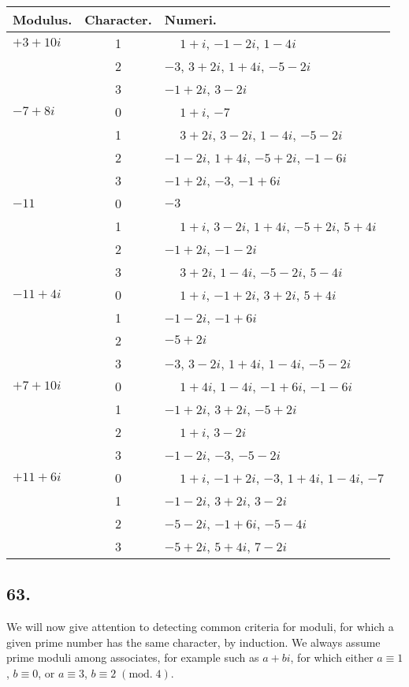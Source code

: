 \documentclass[twoside,12pt, showframe]{memoir}
\renewcommand{\pmod}[1]{\;(\textrm{mod.}\;#1)}
\begin{document}
\begin{center}
\begin{tabular}{l|c|l}
Modulus. & Character. & Numeri. \\
\hline
\(+3+10 i\) & 1 & \(\phantom{+}1+i\), \(-1-2 i\), \(1-4 i\) \\
 & 2 & \(-3\), \(3+2 i\), \(1+4 i\), \(-5-2 i\) \\
 & 3 & \(-1+2 i\), \(3-2 i\) \\
\(-7+8 i\) & 0 & \(\phantom{+}1+i\), \(-7\) \\
 & 1 & \(\phantom{+}3+2 i\), \(3-2 i\), \(1-4 i\), \(-5-2 i\) \\
 & 2 & \(-1-2 i\), \(1+4 i\), \(-5+2 i\), \(-1-6 i\) \\
 & 3 & \(-1+2 i\), \(-3\), \(-1+6 i\) \\
\(-11\) & 0 & \(-3\) \\
 & 1 & \(\phantom{+}1+i\), \(3-2 i\), \(1+4 i\), \(-5+2 i\), \(5+4 i\) \\
 & 2 & \(-1+2 i\), \(-1-2 i\) \\
 & 3 & \(\phantom{+}3+2 i\), \(1-4 i\), \(-5-2 i\), \(5-4 i\) \\
\(-11+4 i\) & 0 & \(\phantom{+}1+i\), \(-1+2 i\), \(3+2 i\), \(5+4 i\) \\
 & 1 & \(-1-2 i\), \(-1+6 i\) \\
 & 2 & \(-5+2 i\) \\
 & 3 & \(-3\), \(3-2 i\), \(1+4 i\), \(1-4 i\), \(-5-2 i\) \\
\(+7+10 i\) & 0 & \(\phantom{+}1+4 i\), \(1-4 i\), \(-1+6 i\), \(-1-6 i\) \\
 & 1 & \(-1+2 i\), \(3+2 i\), \(-5+2 i\) \\
 & 2 & \(\phantom{+}1+i\), \(3-2 i\) \\
 & 3 & \(-1-2 i\), \(-3\), \(-5-2 i\) \\
\(+11+6 i\) & 0 & \(\phantom{+}1+i\), \(-1+2 i\), \(-3\), \(1+4 i\), \(1-4 i\), \(-7\) \\
 & 1 & \(-1-2 i\), \(3+2 i\), \(3-2 i\) \\
 & 2 & \(-5-2 i\), \(-1+6 i\), \(-5-4 i\) \\
 & 3 & \(-5+2 i\), \(5+4 i\), \(7-2 i\) \\
\end{tabular}
\end{center}
%

\subsection*{63.}
We will now give attention to detecting common criteria for moduli, for which a given prime number has the same character, by induction. We always assume prime moduli among associates, for example such as \(a+b i\), for which either \(a \equiv 1\), \( b \equiv 0\), or \(a \equiv 3\), \( b \equiv 2\pmod{4}\).
\end{document}
